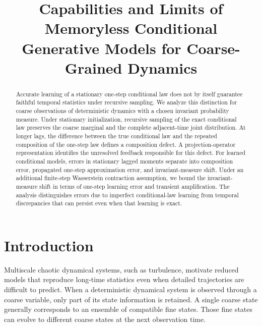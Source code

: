 \documentclass[final,hidelinks]{siamart251216}
\title{Capabilities and Limits of Memoryless Conditional Generative Models for Coarse-Grained Dynamics}%
\begin{document}
\maketitle

\begin{abstract}
Accurate learning of a stationary one-step conditional law does not by
itself guarantee faithful temporal statistics under recursive sampling.
We analyze this distinction for coarse observations of deterministic
dynamics with a chosen invariant probability measure. Under stationary
initialization, recursive sampling of the exact conditional law preserves
the coarse marginal and the complete adjacent-time joint distribution.
At longer lags, the difference between the true conditional law and the
repeated composition of the one-step law defines a composition defect.
A projection-operator representation identifies the unresolved feedback
responsible for this defect. For learned conditional models, errors in
stationary lagged moments separate into composition error, propagated
one-step approximation error, and invariant-measure shift. Under an
additional finite-step Wasserstein contraction assumption, we bound the
invariant-measure shift in terms of one-step learning error and transient
amplification. The analysis distinguishes errors due to imperfect
conditional-law learning from temporal discrepancies that can persist
even when that learning is exact.
\end{abstract}



\section{Introduction}
\label{sec:intro}

Multiscale chaotic dynamical systems, such as turbulence, motivate reduced models that reproduce long-time statistics even when detailed trajectories are difficult to predict. When a deterministic dynamical system is observed through a coarse variable, only part of its state information is retained. A single coarse state generally corresponds to an ensemble of compatible fine states. Those fine states can evolve to different coarse states at the next observation time.
\end{document}
